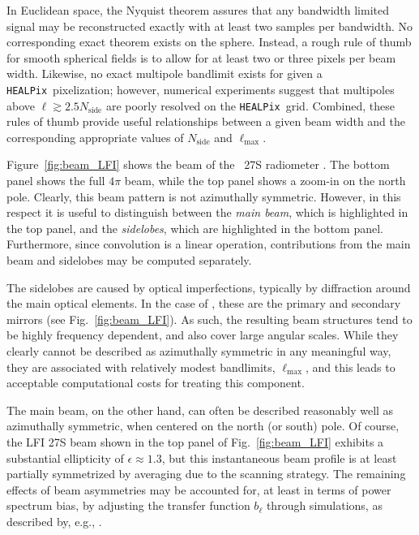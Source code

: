 \documentclass[onecolumn]{aa}
\newcommand{\HEALPix}[0]{\texttt{HEALPix}}
\begin{document}
In Euclidean space, the Nyquist theorem assures that any bandwidth
limited signal may be reconstructed exactly with at least two samples
per bandwidth. No corresponding exact theorem exists on the
sphere. Instead, a rough rule of thumb for smooth spherical fields is
to allow for at least two or three pixels per beam width. Likewise, no
exact multipole bandlimit exists for given a \HEALPix\ pixelization;
however, numerical experiments suggest that multipoles above $\ell
\gtrsim 2.5N_{\mathrm{side}}$ are poorly resolved on the \HEALPix\ 
grid. Combined, these rules of thumb provide useful relationships
between a given beam width and the corresponding appropriate values of
$N_{\mathrm{side}}$ and $\ell_{\mathrm{max}}$. 

Figure~\ref{fig:beam_LFI} shows the beam of the \Planck\ 27S
radiometer \citep{planck2013-p02d}. The bottom panel shows the full
$4\pi$ beam, while the top panel shows a zoom-in on the north
pole. Clearly, this beam pattern is not azimuthally
symmetric. However, in this respect it is useful to distinguish
between the \emph{main beam}, which is highlighted in the top panel,
and the \emph{sidelobes}, which are highlighted in the bottom
panel. Furthermore, since convolution is a linear operation,
contributions from the main beam and sidelobes may be computed
separately.

The sidelobes are caused by optical imperfections,
typically by diffraction around the main optical elements. In the case
of \Planck, these are the primary and secondary mirrors (see
Fig.~\ref{fig:beam_LFI}). As such, the resulting beam structures tend
to be highly frequency dependent, and also cover large angular
scales. While they clearly cannot be described as azimuthally
symmetric in any meaningful way, they are associated with relatively
modest bandlimits, $\ell_{\mathrm{max}}$, and this leads to acceptable
computational costs for treating this component.

The main beam, on the other hand, can often be described reasonably
well as azimuthally symmetric, when centered on the north (or south)
pole. Of course, the LFI 27S beam shown in the top panel of
Fig.~\ref{fig:beam_LFI} exhibits a substantial ellipticity of
$\epsilon \approx 1.3$, but this instantaneous beam profile is at
least partially symmetrized by averaging due to the scanning strategy. 
The remaining effects of beam asymmetries may be accounted for, at least
in terms of power spectrum bias, by adjusting the transfer function
$b_{\ell}$ through simulations, as described by, e.g.,
\citet{mitra2010}.
\end{document}
